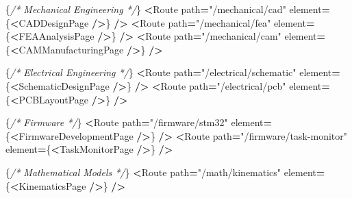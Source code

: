 \documentclass[
]{article}
\newenvironment{Shaded}{\begin{snugshade}}{\end{snugshade}}
\newcommand{\CommentTok}[1]{\textcolor[rgb]{0.56,0.35,0.01}{\textit{#1}}}
\newcommand{\NormalTok}[1]{#1}
\newcommand{\OperatorTok}[1]{\textcolor[rgb]{0.81,0.36,0.00}{\textbf{#1}}}
\newcommand{\StringTok}[1]{\textcolor[rgb]{0.31,0.60,0.02}{#1}}
\begin{document}
\begin{Shaded}
\begin{Highlighting}[]
\NormalTok{            \{}\CommentTok{/* Mechanical Engineering */}\NormalTok{\}}
            \OperatorTok{\textless{}}\NormalTok{Route path}\OperatorTok{=}\StringTok{"/mechanical/cad"}\NormalTok{ element}\OperatorTok{=}\NormalTok{\{}\OperatorTok{\textless{}}\NormalTok{CADDesignPage }\OperatorTok{/\textgreater{}}\NormalTok{\} }\OperatorTok{/\textgreater{}}
            \OperatorTok{\textless{}}\NormalTok{Route path}\OperatorTok{=}\StringTok{"/mechanical/fea"}\NormalTok{ element}\OperatorTok{=}\NormalTok{\{}\OperatorTok{\textless{}}\NormalTok{FEAAnalysisPage }\OperatorTok{/\textgreater{}}\NormalTok{\} }\OperatorTok{/\textgreater{}}
            \OperatorTok{\textless{}}\NormalTok{Route path}\OperatorTok{=}\StringTok{"/mechanical/cam"}\NormalTok{ element}\OperatorTok{=}\NormalTok{\{}\OperatorTok{\textless{}}\NormalTok{CAMManufacturingPage }\OperatorTok{/\textgreater{}}\NormalTok{\} }\OperatorTok{/\textgreater{}}

\NormalTok{            \{}\CommentTok{/* Electrical Engineering */}\NormalTok{\}}
            \OperatorTok{\textless{}}\NormalTok{Route path}\OperatorTok{=}\StringTok{"/electrical/schematic"}\NormalTok{ element}\OperatorTok{=}\NormalTok{\{}\OperatorTok{\textless{}}\NormalTok{SchematicDesignPage }\OperatorTok{/\textgreater{}}\NormalTok{\} }\OperatorTok{/\textgreater{}}
            \OperatorTok{\textless{}}\NormalTok{Route path}\OperatorTok{=}\StringTok{"/electrical/pcb"}\NormalTok{ element}\OperatorTok{=}\NormalTok{\{}\OperatorTok{\textless{}}\NormalTok{PCBLayoutPage }\OperatorTok{/\textgreater{}}\NormalTok{\} }\OperatorTok{/\textgreater{}}

\NormalTok{            \{}\CommentTok{/* Firmware */}\NormalTok{\}}
            \OperatorTok{\textless{}}\NormalTok{Route path}\OperatorTok{=}\StringTok{"/firmware/stm32"}\NormalTok{ element}\OperatorTok{=}\NormalTok{\{}\OperatorTok{\textless{}}\NormalTok{FirmwareDevelopmentPage }\OperatorTok{/\textgreater{}}\NormalTok{\} }\OperatorTok{/\textgreater{}}
            \OperatorTok{\textless{}}\NormalTok{Route path}\OperatorTok{=}\StringTok{"/firmware/task{-}monitor"}\NormalTok{ element}\OperatorTok{=}\NormalTok{\{}\OperatorTok{\textless{}}\NormalTok{TaskMonitorPage }\OperatorTok{/\textgreater{}}\NormalTok{\} }\OperatorTok{/\textgreater{}}

\NormalTok{            \{}\CommentTok{/* Mathematical Models */}\NormalTok{\}}
            \OperatorTok{\textless{}}\NormalTok{Route path}\OperatorTok{=}\StringTok{"/math/kinematics"}\NormalTok{ element}\OperatorTok{=}\NormalTok{\{}\OperatorTok{\textless{}}\NormalTok{KinematicsPage }\OperatorTok{/\textgreater{}}\NormalTok{\} }\OperatorTok{/\textgreater{}}


\end{Highlighting}
\end{Shaded}
\end{document}
